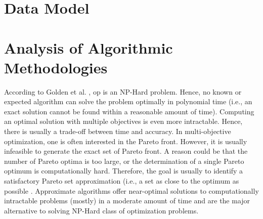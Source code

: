 \section{Data Model}

\section{Analysis of Algorithmic Methodologies}\label{sec:alg_approaches}
According to Golden et al. \parencite{Golden1987TheProblem}, \gls{op} is an NP-Hard problem. Hence, no known or expected algorithm can solve the problem optimally in polynomial time (i.e., an exact solution cannot be found within a reasonable amount of time). Computing an optimal solution with multiple objectives is even more intractable. Hence, there is usually a trade-off between time and accuracy. In multi-objective optimization, one is often interested in the Pareto front. However, it is usually infeasible to generate the exact set of Pareto front. A reason could be that the number of Pareto optima is too large, or the determination of a single Pareto optimum is computationally hard. Therefore, the goal is usually to identify a satisfactory Pareto set approximation (i.e., a set as close to the optimum as possible \parencite{Fonseca2005AOptimizers}. Approximate algorithms offer near-optimal solutions to computationally intractable problems (mostly) in a moderate amount of time and are the major alternative to solving NP-Hard class of optimization problems.

